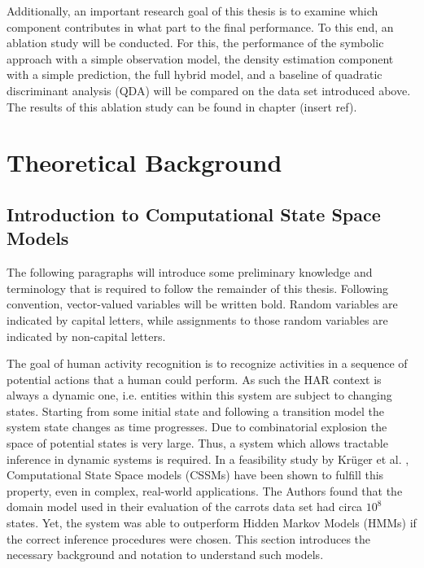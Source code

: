 \documentclass[11pt,titlepage,oneside,openany]{book}
\begin{document}
Additionally, an important research goal of this thesis is to examine which component contributes in what part to the final performance. To this end, an ablation study will be conducted. For this, the performance of the symbolic approach with a simple observation model, the density estimation component with a simple prediction, the full hybrid model, and a baseline of quadratic discriminant analysis (QDA) will be compared on the data set introduced above. The results of this ablation study can be found in chapter (insert ref).

 
 



\chapter{Theoretical Background}
\label{cha:theory}

\section{Introduction to Computational State Space Models}
\label{sec:cssm}
The following paragraphs will introduce some preliminary knowledge and terminology that is required to follow the remainder  of this thesis. Following convention, vector-valued variables will be written bold. Random variables are indicated by capital letters, while assignments to those random variables are indicated by non-capital letters.

The goal of human activity recognition is to recognize activities in a sequence of potential actions that a human could perform. As such the HAR context is always a dynamic one, i.e. entities within this system are subject to changing states. Starting from some initial state and following a transition model the system state changes as time progresses. Due to combinatorial explosion the space of potential states is very large. Thus, a system which allows tractable inference in dynamic systems is required. In a feasibility study by Kr\"uger et al.  \cite{kruger_computational_2014}, Computational State Space models (CSSMs) have been shown to fulfill this property, even in complex, real-world applications. The Authors found that the domain model used in their evaluation of the carrots data set had circa $10^8$ states. Yet, the system was able to outperform Hidden Markov Models (HMMs) if the correct inference procedures were chosen. This section introduces the necessary background and notation to understand such models.
\end{document}
